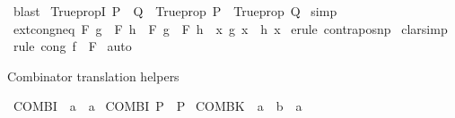 \begin{isabellebody}
%
\isadelimproof
%
\endisadelimproof
%
\isatagproof
{}\isamarkupfalse%
\ blast%
\endisatagproof
{\isafoldproof}%
%
\isadelimproof
%
\endisadelimproof
%
\isadelimdocument
%
\endisadelimdocument
%
\isatagdocument
%
\isamarkuptrue%
%
\endisatagdocument
{\isafolddocument}%
%
\isadelimdocument
%
\endisadelimdocument
{}\isamarkupfalse%
\ TruepropI{\isacharcolon}{\kern0pt}\ {\isachardoublequoteopen}P\ {\isasymequiv}\ Q\ {\isasymLongrightarrow}\ Trueprop\ P\ {\isasymequiv}\ Trueprop\ Q{\isachardoublequoteclose}\isanewline
%
\isadelimproof
%
\endisadelimproof
%
\isatagproof
{}\isamarkupfalse%
\ simp%
\endisatagproof
{\isafoldproof}%
%
\isadelimproof
\isanewline
%
\endisadelimproof
\isanewline
{}\isamarkupfalse%
\ ext{\isacharunderscore}{\kern0pt}cong{\isacharunderscore}{\kern0pt}neq{\isacharcolon}{\kern0pt}\ {\isachardoublequoteopen}F\ g\ {\isasymnoteq}\ F\ h\ {\isasymLongrightarrow}\ F\ g\ {\isasymnoteq}\ F\ h\ {\isasymand}\ {\isacharparenleft}{\kern0pt}{\isasymexists}x{\isachardot}{\kern0pt}\ g\ x\ {\isasymnoteq}\ h\ x{\isacharparenright}{\kern0pt}{\isachardoublequoteclose}\isanewline
%
\isadelimproof
%
\endisadelimproof
%
\isatagproof
{}\isamarkupfalse%
\ {\isacharparenleft}{\kern0pt}erule\ contrapos{\isacharunderscore}{\kern0pt}np{\isacharparenright}{\kern0pt}\isanewline
{}\isamarkupfalse%
\ clarsimp\isanewline
{}\isamarkupfalse%
\ {\isacharparenleft}{\kern0pt}rule\ cong{\isacharbrackleft}{\kern0pt}\ f\ {\isacharequal}{\kern0pt}\ F{\isacharbrackright}{\kern0pt}{\isacharparenright}{\kern0pt}\isanewline
{}\isamarkupfalse%
\ auto%
\endisatagproof
{\isafoldproof}%
%
\isadelimproof
%
\endisadelimproof
%
\begin{isamarkuptext}%
Combinator translation helpers%
\end{isamarkuptext}\isamarkuptrue%
\isamarkupfalse%
\ COMBI\ {\isacharcolon}{\kern0pt}{\isacharcolon}{\kern0pt}\ {\isachardoublequoteopen}{\isacharprime}{\kern0pt}a\ {\isasymRightarrow}\ {\isacharprime}{\kern0pt}a{\isachardoublequoteclose}\ \isanewline
{\isachardoublequoteopen}COMBI\ P\ {\isacharequal}{\kern0pt}\ P{\isachardoublequoteclose}\isanewline
\isanewline
{}\isamarkupfalse%
\ COMBK\ {\isacharcolon}{\kern0pt}{\isacharcolon}{\kern0pt}\ {\isachardoublequoteopen}{\isacharprime}{\kern0pt}a\ {\isasymRightarrow}\ {\isacharprime}{\kern0pt}b\ {\isasymRightarrow}\ {\isacharprime}{\kern0pt}a{\isachardoublequoteclose}\ \isanewline

\end{isabellebody}
